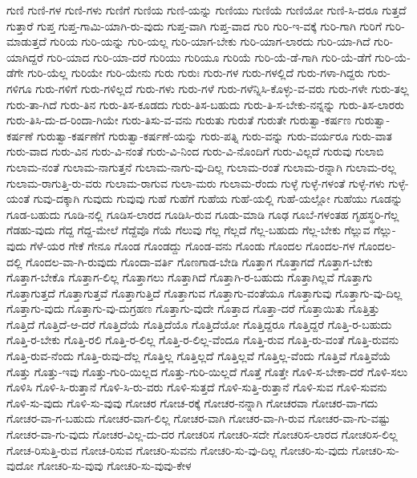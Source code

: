 {ಗುಣಿ
ಗುಣಿ-ಗಳ
ಗುಣಿ-ಗಳು
ಗುಣಿಗೆ
ಗುಣಿಯ
ಗುಣಿ-ಯನ್ನು
ಗುಣಿಯು
ಗುಣಿಯೆ
ಗುಣಿಯೋ
ಗುಣಿ-ಸಿ-ದರೂ
ಗುತ್ತದೆ
ಗುತ್ತಾರೆ
ಗುಪ್ತ
ಗುಪ್ತ-ಗಾಮಿ-ಯಾಗಿ-ರು-ವುದು
ಗುಪ್ತ-ವಾಗಿ
ಗುಪ್ತ-ವಾದ
ಗುರಿ
ಗುರಿ-ಇ-ವಕ್ಕೆ
ಗುರಿ-ಗಾಗಿ
ಗುರಿಗೆ
ಗುರಿ-ಮಾಡುತ್ತದೆ
ಗುರಿಯ
ಗುರಿ-ಯನ್ನು
ಗುರಿ-ಯಲ್ಲ
ಗುರಿ-ಯಾಗ-ಬೇಕು
ಗುರಿ-ಯಾಗ-ಲಾರದು
ಗುರಿ-ಯಾ-ಗಿದೆ
ಗುರಿ-ಯಾಗಿದ್ದರೆ
ಗುರಿ-ಯಾದ
ಗುರಿ-ಯಾ-ದರೆ
ಗುರಿಯು
ಗುರಿಯೂ
ಗುರಿಯೆ
ಗುರಿ-ಯೆ-ಡೆ-ಗಾಗಿ
ಗುರಿ-ಯೆ-ಡೆಗೆ
ಗುರಿ-ಯೆ-ಡೆಗೇ
ಗುರಿ-ಯೆಲ್ಲ
ಗುರಿಯೇ
ಗುರಿ-ಯೇನು
ಗುರು
ಗುರುಃ
ಗುರು-ಗಳ
ಗುರು-ಗಳಲ್ಲಿದೆ
ಗುರು-ಗಳಾ-ಗಿದ್ದರು
ಗುರು-ಗಳಿಗೂ
ಗುರು-ಗಳಿಗೆ
ಗುರು-ಗಳಿಲ್ಲದೆ
ಗುರು-ಗಳು
ಗುರು-ಗಳೆ
ಗುರು-ಗಳೆನ್ನಿಸಿ-ಕೊಳ್ಳು-ವ-ವರು
ಗುರು-ಗಳೇ
ಗುರು-ತಲ್ಲ
ಗುರು-ತಾ-ಗಿದೆ
ಗುರು-ತಿನ
ಗುರು-ತಿಸ-ಕೂಡದು
ಗುರು-ತಿಸ-ಬಹುದು
ಗುರು-ತಿ-ಸ-ಬೇಕು-ನನ್ನನ್ನು
ಗುರು-ತಿಸ-ಲಾರರು
ಗುರು-ತಿಸಿ-ದು-ದ-ರಿಂದಾ-ಗಿಯೇ
ಗುರು-ತಿಸು-ವ-ವನು
ಗುರುತು
ಗುರುತೆ
ಗುರುತೇ
ಗುರುತ್ವಾ-ಕರ್ಷಣ
ಗುರುತ್ವಾ-ಕರ್ಷಣೆ
ಗುರುತ್ವಾ-ಕರ್ಷಣೆಗೆ
ಗುರುತ್ವಾ-ಕರ್ಷಣೆ-ಯನ್ನು
ಗುರು-ಪತ್ನಿ
ಗುರು-ವನ್ನು
ಗುರು-ವರ್ಯರೂ
ಗುರು-ವಾತ
ಗುರು-ವಾದ
ಗುರು-ವಿನ
ಗುರು-ವಿ-ನಂತೆ
ಗುರು-ವಿ-ನಿಂದ
ಗುರು-ವಿ-ನೊಂದಿಗೆ
ಗುರು-ವಿಲ್ಲದೆ
ಗುರುವು
ಗುಲಾಬಿ
ಗುಲಾಮ-ನಂತೆ
ಗುಲಾಮ-ನಾಗುತ್ತನೆ
ಗುಲಾಮ-ನಾಗು-ವು-ದಿಲ್ಲ
ಗುಲಾಮ-ರಂತೆ
ಗುಲಾಮ-ರನ್ನಾಗಿ
ಗುಲಾಮ-ರಲ್ಲ
ಗುಲಾಮ-ರಾಗುತ್ತಿ-ರು-ವರು
ಗುಲಾಮ-ರಾಗುವ
ಗುಲಾ-ಮರು
ಗುಲಾಮ-ರೆಂದು
ಗುಳ್ಳೆ
ಗುಳ್ಳೆ-ಗಳಂತೆ
ಗುಳ್ಳೆ-ಗಳು
ಗುಳ್ಳೆ-ಯಂತೆ
ಗುವು-ದಕ್ಕಾಗಿ
ಗುವುದು
ಗುವುವು
ಗುಹೆ
ಗುಹೆಗೆ
ಗುಹೆಯ
ಗುಹೆ-ಯಲ್ಲಿ
ಗುಹೆ-ಯಲ್ಲೋ
ಗುಹೆಯು
ಗೂಡನ್ನು
ಗೂಡ-ಬಹುದು
ಗೂಡಿ-ನಲ್ಲಿ
ಗೂಡಿಸ-ಲಾರದ
ಗೂಡಿಸಿ-ರುವ
ಗೂಡು-ಮಾಡಿ
ಗೂಢ
ಗೂಬೆ-ಗಳಂತಹ
ಗೃಹಸ್ಥರಿ-ಗೆಲ್ಲ
ಗೆಡಹು-ವುದು
ಗೆದ್ದ
ಗೆದ್ದ-ಮೇಲೆ
ಗೆದ್ದೆವೊ
ಗೆಯೆ
ಗೆಲುವು
ಗೆಲ್ಲ
ಗೆಲ್ಲದೆ
ಗೆಲ್ಲ-ಬಹುದು
ಗೆಲ್ಲ-ಬೇಕು
ಗೆಲ್ಲುವ
ಗೆಲ್ಲು-ವುದು
ಗೆಳೆ-ಯರ
ಗೇಕೆ
ಗೇನೂ
ಗೊಂಡ
ಗೊಂಡದ್ದು
ಗೊಂಡ-ವನು
ಗೊಂಡು
ಗೊಂದಲ
ಗೊಂದಲ-ಗಳ
ಗೊಂದಲ-ದಲ್ಲಿ
ಗೊಂದಲ-ವಾ-ಗಿ-ರುವುದು
ಗೊಂದಾ-ವರ್ತಿ
ಗೊಣಗಾಡ-ಬೇಡಿ
ಗೊತ್ತಾಗ
ಗೊತ್ತಾಗದೆ
ಗೊತ್ತಾಗ-ಬೇಕು
ಗೊತ್ತಾಗ-ಬೇಕೊ
ಗೊತ್ತಾಗ-ಲಿಲ್ಲ
ಗೊತ್ತಾಗಲು
ಗೊತ್ತಾಗಿದೆ
ಗೊತ್ತಾಗಿ-ರ-ಬಹುದು
ಗೊತ್ತಾಗಿಲ್ಲವೆ
ಗೊತ್ತಾಗು
ಗೊತ್ತಾಗುತ್ತದೆ
ಗೊತ್ತಾಗುತ್ತವೆ
ಗೊತ್ತಾಗುತ್ತಿದೆ
ಗೊತ್ತಾಗುವ
ಗೊತ್ತಾಗು-ವಂತೆಯೂ
ಗೊತ್ತಾಗುವು
ಗೊತ್ತಾಗು-ವು-ದಿಲ್ಲ
ಗೊತ್ತಾಗು-ವುದು
ಗೊತ್ತಾಗು-ವು-ದುಗ್ರಹಣ
ಗೊತ್ತಾಗು-ವುದೇ
ಗೊತ್ತಾದ
ಗೊತ್ತಾ-ದರೆ
ಗೊತ್ತಾಯಿತು
ಗೊತ್ತಿತ್ತು
ಗೊತ್ತಿದೆ
ಗೊತ್ತಿದೆ-ಆ-ದರೆ
ಗೊತ್ತಿದೆಯೆ
ಗೊತ್ತಿದೆಯೊ
ಗೊತ್ತಿದೆಯೋ
ಗೊತ್ತಿದ್ದರೂ
ಗೊತ್ತಿದ್ದರೆ
ಗೊತ್ತಿ-ರ-ಬಹುದು
ಗೊತ್ತಿ-ರ-ಬೇಕು
ಗೊತ್ತಿ-ರಲಿ
ಗೊತ್ತಿ-ರ-ಲಿಲ್ಲ
ಗೊತ್ತಿ-ರ-ಲಿಲ್ಲ-ವೆಂದೂ
ಗೊತ್ತಿ-ರುವ
ಗೊತ್ತಿ-ರು-ವಂತೆ
ಗೊತ್ತಿ-ರುವನು
ಗೊತ್ತಿ-ರುವ-ನೆಂದು
ಗೊತ್ತಿ-ರುವು-ದೆಲ್ಲ
ಗೊತ್ತಿಲ್ಲ
ಗೊತ್ತಿಲ್ಲದೆ
ಗೊತ್ತಿಲ್ಲವೆ
ಗೊತ್ತಿಲ್ಲ-ವೆಂದು
ಗೊತ್ತಿವೆ
ಗೊತ್ತಿವೆಯೆ
ಗೊತ್ತು
ಗೊತ್ತು-ಇವು
ಗೊತ್ತು-ಗುರಿ-ಯಿಲ್ಲದ
ಗೊತ್ತು-ಗುರಿ-ಯಿಲ್ಲದೆ
ಗೊತ್ತೆ
ಗೊತ್ತೇ
ಗೊಳಿ-ಸ-ಬೇಕಾ-ದರೆ
ಗೊಳಿ-ಸಲು
ಗೊಳಿಸಿ
ಗೊಳಿ-ಸಿ-ರುತ್ತಾನೆ
ಗೊಳಿ-ಸಿ-ರು-ವರು
ಗೊಳಿ-ಸುತ್ತದೆ
ಗೊಳಿ-ಸುತ್ತಿ-ರುತ್ತಾನೆ
ಗೊಳಿ-ಸುವ
ಗೊಳಿ-ಸುವನು
ಗೊಳಿ-ಸು-ವುದು
ಗೊಳಿ-ಸು-ವುವು
ಗೋಚರ
ಗೋಚ-ರಕ್ಕೆ
ಗೋಚರ-ನನ್ನಾಗಿ
ಗೋಚರವಾ
ಗೋಚರ-ವಾ-ಗದು
ಗೋಚರ-ವಾ-ಗ-ಬಹುದು
ಗೋಚರ-ವಾಗ-ಲಿಲ್ಲ
ಗೋಚರ-ವಾಗಿ
ಗೋಚರ-ವಾ-ಗಿ-ರುವ
ಗೋಚರ-ವಾ-ಗು-ವಷ್ಟು
ಗೋಚರ-ವಾ-ಗು-ವುದು
ಗೋಚರ-ವಿಲ್ಲ-ದು-ದರ
ಗೋಚರಿಸ
ಗೋಚರಿ-ಸದೇ
ಗೋಚರಿಸ-ಲಾರದ
ಗೋಚರಿಸ-ಲಿಲ್ಲ
ಗೋಚ-ರಿಸುತ್ತಿ-ರುವ
ಗೋಚ-ರಿಸುವ
ಗೋಚರಿ-ಸುವನು
ಗೋಚರಿ-ಸು-ವು-ದಿಲ್ಲ
ಗೋಚರಿ-ಸು-ವುದು
ಗೋಚರಿ-ಸು-ವುದೋ
ಗೋಚರಿ-ಸು-ವುವು
ಗೋಚರಿ-ಸು-ವುವು-ಕೇಳ
}
